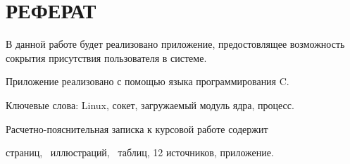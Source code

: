 
\setcounter{page}{3}

\chapter*{РЕФЕРАТ}

В данной работе будет реализовано приложение, предостовлящее возможность сокрытия присутствия пользователя в системе.


Приложение реализовано с помощью языка программирования C.

Ключевые слова: Linux, сокет, загружаемый модуль ядра, процесс.

Расчетно-пояснительная записка к курсовой работе содержит  \begin{NoHyper}\pageref{LastPage}\end{NoHyper} страниц, \totfig~иллюстраций, \tottab~таблиц, 12 источников,  приложение.